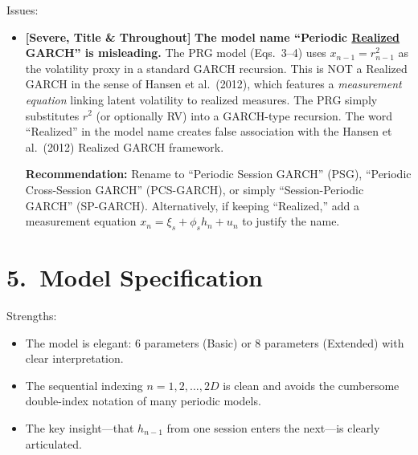 \documentclass[12pt,a4paper]{article}
\begin{document}
\noindent \textcolor{errorred}{Issues:}
\begin{itemize}[nosep]
\item [\textcolor{errorred}{S1}] \textbf{[Severe, Title \& Throughout]} \textbf{The model name ``Periodic \underline{Realized} GARCH'' is misleading.} The PRG model (Eqs.~3--4) uses $x_{n-1} = r^2_{n-1}$ as the volatility proxy in a standard GARCH recursion. This is NOT a Realized GARCH in the sense of Hansen et al.\ (2012), which features a \emph{measurement equation} linking latent volatility to realized measures. The PRG simply substitutes $r^2$ (or optionally RV) into a GARCH-type recursion. The word ``Realized'' in the model name creates false association with the Hansen et al.\ (2012) Realized GARCH framework.

  \textbf{Recommendation:} Rename to ``Periodic Session GARCH'' (PSG), ``Periodic Cross-Session GARCH'' (PCS-GARCH), or simply ``Session-Periodic GARCH'' (SP-GARCH). Alternatively, if keeping ``Realized,'' add a measurement equation $x_n = \xi_s + \phi_s h_n + u_n$ to justify the name.
\end{itemize}

\bigskip

\section*{5.\ Model Specification}

\noindent \textcolor{okgreen}{Strengths:}
\begin{itemize}[nosep]
\item The model is elegant: 6 parameters (Basic) or 8 parameters (Extended) with clear interpretation.
\item The sequential indexing $n=1,2,\ldots,2D$ is clean and avoids the cumbersome double-index notation of many periodic models.
\item The key insight---that $h_{n-1}$ from one session enters the next---is clearly articulated.
\end{itemize}
\end{document}
